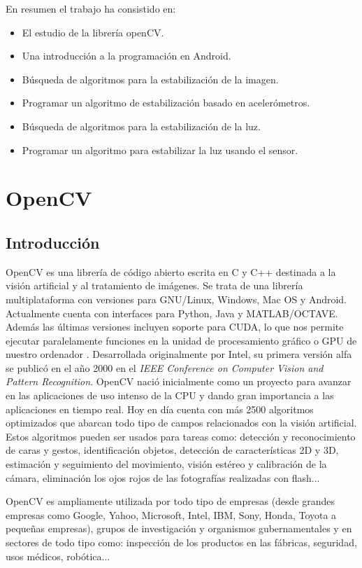 \documentclass[a4paper,openright, 12pt]{book}
\begin{document}
En resumen el trabajo ha consistido en:
\begin{itemize}
\item El estudio de la librería openCV.
\item Una introducción a la programación en Android.
\item Búsqueda de algoritmos para la estabilización de la imagen.
\item Programar un algoritmo de estabilización basado en acelerómetros.
\item Búsqueda de algoritmos para la estabilización de la luz.
\item Programar un algoritmo para estabilizar la luz usando el sensor.
\end{itemize}
\chapter{OpenCV} \label{cap.opencv}

\section{Introducción}
OpenCV\cite{opencvrefman} es una librería de código abierto escrita en C y C++ destinada a la visión artificial y al tratamiento de imágenes. Se trata de una librería multiplataforma con versiones para GNU/Linux, Windows, Mac OS y Android. Actualmente cuenta con interfaces para Python, Java y MATLAB/OCTAVE. Además las últimas versiones incluyen soporte para CUDA, lo que nos permite ejecutar paralelamente funciones en la unidad de procesamiento gráfico o GPU de nuestro ordenador .
Desarrollada originalmente por Intel, su primera versión alfa se publicó en el año 2000 en el \textit{IEEE Conference on Computer Vision and Pattern Recognition}. OpenCV nació inicialmente como un proyecto para avanzar en las aplicaciones de uso intenso de la CPU y dando gran importancia a las aplicaciones en tiempo real. Hoy en día cuenta con más 2500 algoritmos optimizados que abarcan todo tipo de campos relacionados con la visión artificial.
Estos algoritmos pueden ser usados para tareas como: detección y reconocimiento de caras y gestos, identificación objetos, detección de características 2D y 3D, estimación y seguimiento del movimiento, visión estéreo y calibración de la cámara, eliminación los ojos rojos de las fotografías realizadas con flash...

OpenCV es ampliamente utilizada por todo tipo de empresas (desde grandes empresas como Google, Yahoo, Microsoft, Intel, IBM, Sony, Honda, Toyota a pequeñas empresas), grupos de investigación y organismos gubernamentales y en sectores de todo tipo como: inspección de los productos en las fábricas, seguridad, usos médicos, robótica...
\end{document}
